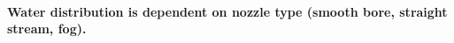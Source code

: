 \documentclass{article}
\begin{document}


\paragraph{Water distribution is dependent on nozzle type (smooth bore, straight stream, fog).} \mbox{}


\end{document}
